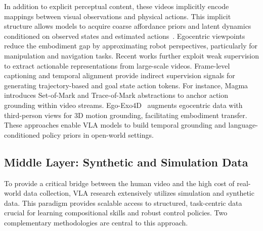 \documentclass[10pt, a4paper, logo, copyright]{googledeepmind} %
\begin{document}
In addition to explicit perceptual content, these videos implicitly encode mappings between visual observations and physical actions. This implicit structure allows models to acquire coarse affordance priors and latent dynamics conditioned on observed states and estimated actions~\cite{wu2023unleashinglargescalevideogenerative, cheang2024gr2generativevideolanguageactionmodel, mendonca2023structured}. Egocentric viewpoints reduce the embodiment gap by approximating robot perspectives, particularly for manipulation and navigation tasks. Recent works further exploit weak supervision to extract actionable representations from large-scale videos. Frame-level captioning and temporal alignment provide indirect supervision signals for generating trajectory-based and goal state action tokens. For instance, Magma~\cite{yang2025magma} introduces Set-of-Mark and Trace-of-Mark abstractions to anchor action grounding within video streams. Ego-Exo4D~\cite{grauman2024ego} augments egocentric data with third-person views for 3D motion grounding, facilitating embodiment transfer. These approaches enable VLA models to build temporal grounding and language-conditioned policy priors in open-world settings.

\subsection{Middle Layer: Synthetic and Simulation Data}

To provide a critical bridge between the human video and the high cost of real-world data collection, VLA research extensively utilizes simulation and synthetic data. This paradigm provides scalable access to structured, task-centric data crucial for learning compositional skills and robust control policies. Two complementary methodologies are central to this approach.
\end{document}
